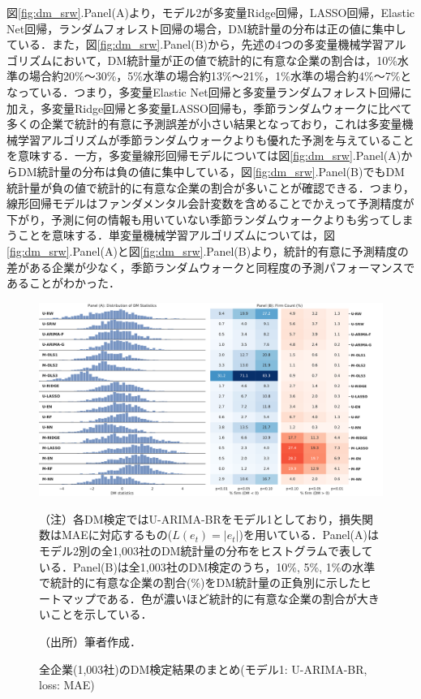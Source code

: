 \documentclass[a4paper，11pt]{jsarticle}
\begin{document}
図\ref{fig:dm_srw}.Panel(A)より，モデル2が多変量Ridge回帰，LASSO回帰，Elastic Net回帰，ランダムフォレスト回帰の場合，DM統計量の分布は正の値に集中している．また，図\ref{fig:dm_srw}.Panel(B)から，先述の4つの多変量機械学習アルゴリズムにおいて，DM統計量が正の値で統計的に有意な企業の割合は，10\%水準の場合約20\%～30\%，5\%水準の場合約13\%～21\%，1\%水準の場合約4\%～7\%となっている．つまり，多変量Elastic Net回帰と多変量ランダムフォレスト回帰に加え，多変量Ridge回帰と多変量LASSO回帰も，季節ランダムウォークに比べて多くの企業で統計的有意に予測誤差が小さい結果となっており，これは多変量機械学習アルゴリズムが季節ランダムウォークよりも優れた予測を与えていることを意味する．一方，多変量線形回帰モデルについては図\ref{fig:dm_srw}.Panel(A)からDM統計量の分布は負の値に集中している，図\ref{fig:dm_srw}.Panel(B)でもDM統計量が負の値で統計的に有意な企業の割合が多いことが確認できる．つまり，線形回帰モデルはファンダメンタル会計変数を含めることでかえって予測精度が下がり，予測に何の情報も用いていない季節ランダムウォークよりも劣ってしまうことを意味する．単変量機械学習アルゴリズムについては，図\ref{fig:dm_srw}.Panel(A)と図\ref{fig:dm_srw}.Panel(B)より，統計的有意に予測精度の差がある企業が少なく，季節ランダムウォークと同程度の予測パフォーマンスであることがわかった．

\begin{figure}[tbp]
  \centering
  \caption{全企業(1,003社)のDM検定結果のまとめ(モデル1: U-ARIMA-BR, loss: MAE)}
  \label{fig:dm_sarima_br}
  \includegraphics[width=\linewidth]{./img/_dm_MAD_y_hat_sarima_br.pdf}
  \begin{threeparttable}
  \begin{tablenotes}
    \item[]（注）各DM検定ではU-ARIMA-BRをモデル1としており，損失関数はMAEに対応するもの($L(e_t)=|e_t|$)を用いている．Panel(A)はモデル2別の全1,003社のDM統計量の分布をヒストグラムで表している．Panel(B)は全1,003社のDM検定のうち，10\%, 5\%, 1\%の水準で統計的に有意な企業の割合(\%)をDM統計量の正負別に示したヒートマップである．色が濃いほど統計的に有意な企業の割合が大きいことを示している．
    \item[]（出所）筆者作成．
  \end{tablenotes}
  \end{threeparttable}
\end{figure}
\end{document}
